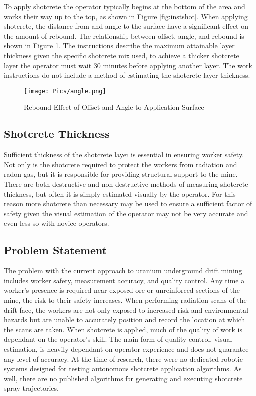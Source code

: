 To apply shotcrete the operator typically begins at the bottom of the area and works their way up to the top, as shown in Figure \ref{fig:instshot}. When applying shotcrete, the distance from and angle to the surface have a significant effect on the amount of rebound. The relationship between offset, angle, and rebound is shown in Figure \ref{fig:rebound}. The instructions describe the maximum attainable layer thickness given the specific shotcrete mix used, to achieve a thicker shotcrete layer the operator must wait 30 minutes before applying another layer. The work instructions do not include a method of estimating the shotcrete layer thickness.\\

\begin{figure}
    \centering
    \texttt{[image: Pics/angle.png]}
    \caption{Rebound Effect of Offset and Angle to Application Surface \cite{camedoc}}
    \label{fig:rebound}
\end{figure}

\subsection{Shotcrete Thickness}

Sufficient thickness of the shotcrete layer is essential in ensuring worker safety. Not only is the shotcrete required to protect the workers from radiation and radon gas, but it is responsible for providing structural support to the mine. There are both destructive and non-destructive methods of measuring shotcrete thickness, but often it is simply estimated visually by the operator. For this reason more shotcrete than necessary may be used to ensure a sufficient factor of safety given the visual estimation of the operator may not be very accurate and even less so with novice operators.\\

\subsection{Problem Statement}

The problem with the current approach to uranium underground drift mining includes worker safety, measurement accuracy, and quality control. Any time a worker's presence is required near exposed ore or unreinforced sections of the mine, the risk to their safety increases. When performing radiation scans of the drift face, the workers are not only exposed to increased risk and environmental hazards but are unable to accurately position and record the location at which the scans are taken. When shotcrete is applied, much of the quality of work is dependant on the operator's skill. The main form of quality control, visual estimation, is heavily dependant on operator experience and does not guarantee any level of accuracy. At the time of research, there were no dedicated robotic systems designed for testing autonomous shotcrete application algorithms. As well, there are no published algorithms for generating and executing shotcrete spray trajectories.\\


